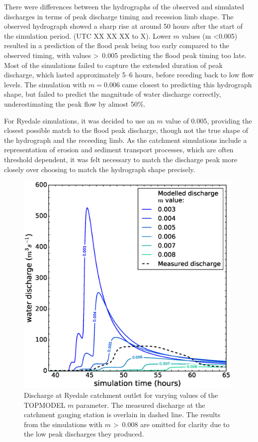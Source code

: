 There were differences between the hydrographs of the observed and simulated discharges in terms of peak discharge timing and recession limb shape. The observed hydrograph showed a sharp rise at around 50 hours after the start of the simulation period. (UTC XX XX XX to X). Lower \(m\) values (m \textless 0.005) resulted in a prediction of the flood peak being too early compared to the observed timing, with values \textgreater \ 0.005 predicting the flood peak timing too late. Most of the simulations failed to capture the extended duration of peak discharge, which lasted approximately 5--6 hours, before receding back to low flow levels. The simulation with \(m = 0.006\) came closest to predicting this hydrograph shape, but failed to predict the magnitude of water discharge correctly, underestimating the peak flow by almost 50\%. 

For Ryedale simulations, it was decided to use an \(m\) value of 0.005, providing the closest possible match to the flood peak discharge, though not the true shape of the hydrograph and the receeding limb. As the catchment simulations include a representation of erosion and sediment transport processes, which are often threshold dependent, it was felt necessary to match the discharge peak more closely over choosing to match the hydrograph shape precisely.

\begin{figure}[t]
\includegraphics[width=11cm]{chp06_figures_scripts/figure_ryedale_M_sens.eps}
\caption{Discharge at Ryedale catchment outlet for varying values of the TOPMODEL \(m\) parameter. The measured discharge at the catchment gauging station is overlain in dashed line. The results from the simulations with \(m\) \textgreater \ 0.008 are omitted for clarity due to the low peak discharges they produced.}
\label{fig_topmodel_m_ryedale}
\end{figure}

